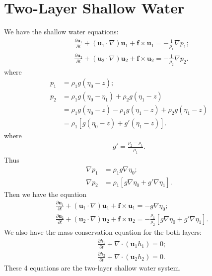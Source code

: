 \documentclass[11pt,letterpaper]{book}
\theoremstyle{definition}
\newcommand{\pe}{\partial}
\newcommand{\ve}[1]{\boldsymbol{#1}}
\begin{document}
\section{Two-Layer Shallow Water}
We have the shallow water equations:
\begin{align*}
&\frac{\pe \ve u_1}{\pe t}+(\ve u_1\cdot\nabla)\ve u_1+\ve f\times \ve u_1 = -\frac{1}{\rho_1}\nabla p_1 ;\\
&\frac{\pe \ve u_2}{\pe t}+(\ve u_2\cdot\nabla)\ve u_2+\ve f\times \ve u_2 = -\frac{1}{\rho_2}\nabla p_2 .
\end{align*}
where
\begin{align*}
p_1 &= \rho_1g(\eta_0-z);\\
p_2 &= \rho_1 g (\eta_0-\eta_1)+\rho_2 g (\eta_1-z)\\
&= \rho_1 g (\eta_0-z)-\rho_1 g (\eta_1-z)+\rho_2 g (\eta_1-z)\\
&= \rho_1[ g (\eta_0-z)+g' (\eta_1-z)].
\end{align*}
where
\begin{align*}
g' = \frac{\rho_2-\rho_1}{\rho_1}.
\end{align*}
Thus
\begin{align*}
\nabla p_1 &= \rho_1g\nabla \eta_0;\\
\nabla p_2 &= \rho_1[ g \nabla \eta_0+g' \nabla \eta_1].
\end{align*}
Then we have the equation
\begin{align}
&\frac{\pe \ve u_1}{\pe t}+(\ve u_1\cdot\nabla)\ve u_1+\ve f\times \ve u_1 = -g\nabla \eta_0 ;\label{eq:jan_2010_1}\\
&\frac{\pe \ve u_2}{\pe t}+(\ve u_2\cdot\nabla)\ve u_2+\ve f\times \ve u_2 = -\frac{\rho_1}{\rho_2}[ g \nabla \eta_0+g' \nabla \eta_1] .\label{eq:jan_2010_2}
\end{align}
We also have the mass conservation equation for the both layers:
\begin{align}
&\frac{\pe h_1}{\pe t}+\nabla\cdot(\ve u_1 h_1) = 0;\label{eq:jan_2010_3}\\
&\frac{\pe h_2}{\pe t}+\nabla\cdot(\ve u_2 h_2) = 0.\label{eq:jan_2010_4}
\end{align}
These 4 equations are the two-layer shallow water system. 
\end{document}
